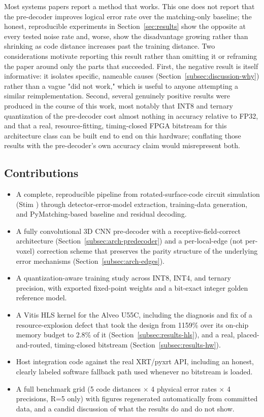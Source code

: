 \documentclass[pdflatex,sn-basic]{sn-jnl}
\begin{document}
Most systems papers report a method that works. This one does not report that the pre-decoder improves logical error rate over the matching-only baseline; the honest, reproducible experiments in Section~\ref{sec:results} show the opposite at every tested noise rate and, worse, show the disadvantage growing rather than shrinking as code distance increases past the training distance. Two considerations motivate reporting this result rather than omitting it or reframing the paper around only the parts that succeeded. First, the negative result is itself informative: it isolates specific, nameable causes (Section~\ref{subsec:discussion-why}) rather than a vague "did not work," which is useful to anyone attempting a similar reimplementation. Second, several genuinely positive results were produced in the course of this work, most notably that INT8 and ternary quantization of the pre-decoder cost almost nothing in accuracy relative to FP32, and that a real, resource-fitting, timing-closed FPGA bitstream for this architecture class can be built end to end on this hardware; conflating those results with the pre-decoder's own accuracy claim would misrepresent both.

\subsection{Contributions}\label{subsec:contributions}

\begin{itemize}
\item A complete, reproducible pipeline from rotated-surface-code circuit simulation (Stim \cite{gidney2021stim}) through detector-error-model extraction, training-data generation, and PyMatching-based baseline and residual decoding.
\item A fully convolutional 3D CNN pre-decoder with a receptive-field-correct architecture (Section~\ref{subsec:arch-predecoder}) and a per-local-edge (not per-voxel) correction scheme that preserves the parity structure of the underlying error mechanisms (Section~\ref{subsec:arch-edges}).
\item A quantization-aware training study across INT8, INT4, and ternary precision, with exported fixed-point weights and a bit-exact integer golden reference model.
\item A Vitis HLS kernel for the Alveo U55C, including the diagnosis and fix of a resource-explosion defect that took the design from 1159\% over its on-chip memory budget to 2.8\% of it (Section~\ref{subsec:results-hls}), and a real, placed-and-routed, timing-closed bitstream (Section~\ref{subsec:results-hw}).
\item Host integration code against the real XRT/pyxrt API, including an honest, clearly labeled software fallback path used whenever no bitstream is loaded.
\item A full benchmark grid (5 code distances \(\times\) 4 physical error rates \(\times\) 4 precisions, R=5 only) with figures regenerated automatically from committed data, and a candid discussion of what the results do and do not show.
\end{itemize}
\end{document}
